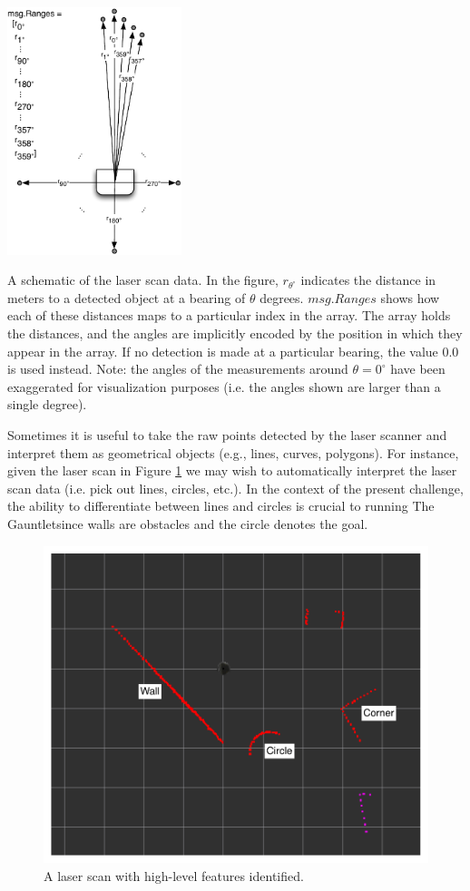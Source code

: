 \documentclass[M3_Night5_Solutions]{subfiles}
\begin{document}
\begin{marginfigure}
\includegraphics[width=2.0in]{figs/laserscanmessage}
\caption{A schematic of the laser scan data.  In the figure, $r_{\theta^\circ}$ indicates the distance in meters to a detected object at a bearing of $\theta$ degrees.   $msg.Ranges$ shows how each of these distances maps to a particular index in the array.  The array holds the distances, and the angles are implicitly encoded by the position in which they appear in the array.  If no detection is made at a particular bearing, the value $0.0$ is used instead.  Note: the angles of the measurements around $\theta = 0^\circ$ have been exaggerated for visualization purposes (i.e. the angles shown are larger than a single degree).\label{fig:laserscanmessage}}
\end{marginfigure}



Sometimes it is useful to take the raw points detected by the laser scanner and interpret them as geometrical objects (e.g., lines, curves, polygons).  For instance, given the laser scan in Figure \ref{fig:scanexample} we may wish to automatically interpret the laser scan data (i.e. pick out lines, circles, etc.).  In the context of the present challenge, the ability to differentiate between lines and circles is crucial to running The Gauntlet\texttrademark  since walls are obstacles and the circle denotes the goal.
\begin{figure}
\begin{center}
\includegraphics[width=.8\linewidth]{figs/playgroundscan}
\end{center}
\caption{A laser scan with high-level features identified.\label{fig:scanexample}}
\end{figure}
\end{document}
